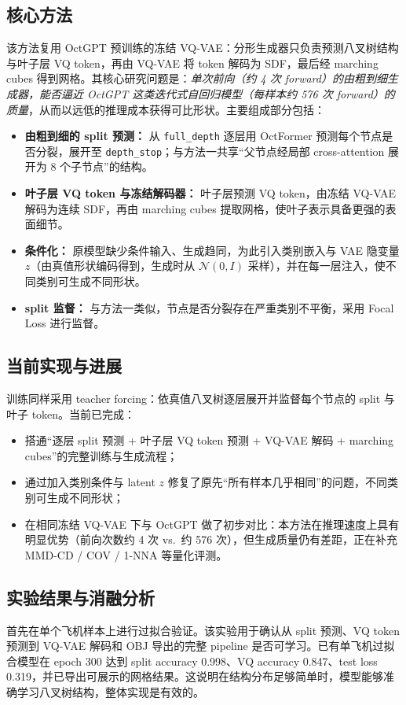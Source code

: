 \documentclass{article}
\begin{document}
\subsection{核心方法}
该方法复用 OctGPT 预训练的冻结 VQ-VAE：分形生成器只负责预测八叉树结构与叶子层 VQ token，再由 VQ-VAE 将 token 解码为 SDF，最后经 marching cubes 得到网格。其核心研究问题是：\emph{单次前向（约 4 次 forward）的由粗到细生成器，能否逼近 OctGPT 这类迭代式自回归模型（每样本约 576 次 forward）的质量}，从而以远低的推理成本获得可比形状。主要组成部分包括：

\begin{itemize}
    \item \textbf{由粗到细的 split 预测：} 从 \texttt{full\_depth} 逐层用 OctFormer 预测每个节点是否分裂，展开至 \texttt{depth\_stop}；与方法一共享“父节点经局部 cross-attention 展开为 8 个子节点”的结构。
    \item \textbf{叶子层 VQ token 与冻结解码器：} 叶子层预测 VQ token，由冻结 VQ-VAE 解码为连续 SDF，再由 marching cubes 提取网格，使叶子表示具备更强的表面细节。
    \item \textbf{条件化：} 原模型缺少条件输入、生成趋同，为此引入类别嵌入与 VAE 隐变量 $z$（由真值形状编码得到，生成时从 $\mathcal{N}(0,I)$ 采样），并在每一层注入，使不同类别可生成不同形状。
    \item \textbf{split 监督：} 与方法一类似，节点是否分裂存在严重类别不平衡，采用 Focal Loss 进行监督。
\end{itemize}

\subsection{当前实现与进展}
训练同样采用 teacher forcing：依真值八叉树逐层展开并监督每个节点的 split 与叶子 token。当前已完成：
\begin{itemize}
    \item 搭通“逐层 split 预测 + 叶子层 VQ token 预测 + VQ-VAE 解码 + marching cubes”的完整训练与生成流程；
    \item 通过加入类别条件与 latent $z$ 修复了原先“所有样本几乎相同”的问题，不同类别可生成不同形状；
    \item 在相同冻结 VQ-VAE 下与 OctGPT 做了初步对比：本方法在推理速度上具有明显优势（前向次数约 4 次 vs.\ 约 576 次），但生成质量仍有差距，正在补充 MMD-CD / COV / 1-NNA 等量化评测。
\end{itemize}

\subsection{实验结果与消融分析}
首先在单个飞机样本上进行过拟合验证。该实验用于确认从 split 预测、VQ token 预测到 VQ-VAE 解码和 OBJ 导出的完整 pipeline 是否可学习。已有单飞机过拟合模型在 epoch 300 达到 split accuracy 0.998、VQ accuracy 0.847、test loss 0.319，并已导出可展示的网格结果。这说明在结构分布足够简单时，模型能够准确学习八叉树结构，整体实现是有效的。
\end{document}
